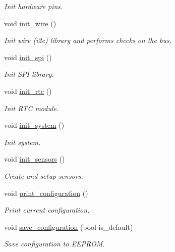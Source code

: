 \begin{DoxyCompactItemize}
\begin{DoxyCompactList}\small\item\em Init hardware pins. \end{DoxyCompactList}\item 
void \hyperlink{i2c-rain_8ino_a2441543100bf8421f56edd622a2c1d9a}{init\+\_\+wire} ()
\begin{DoxyCompactList}\small\item\em Init wire (i2c) library and performs checks on the bus. \end{DoxyCompactList}\item 
void \hyperlink{i2c-rain_8ino_a8eb9780a3438ec02c70314744f91f3c7}{init\+\_\+spi} ()
\begin{DoxyCompactList}\small\item\em Init S\+PI library. \end{DoxyCompactList}\item 
void \hyperlink{i2c-rain_8ino_ab985cc69f5f573113405b4f118c96d33}{init\+\_\+rtc} ()
\begin{DoxyCompactList}\small\item\em Init R\+TC module. \end{DoxyCompactList}\item 
void \hyperlink{i2c-rain_8ino_afceb890a6ab9be73cc5481369538c705}{init\+\_\+system} ()
\begin{DoxyCompactList}\small\item\em Init system. \end{DoxyCompactList}\item 
void \hyperlink{i2c-rain_8ino_ac74850003fab6eb3269bfe043d0f939c}{init\+\_\+sensors} ()
\begin{DoxyCompactList}\small\item\em Create and setup sensors. \end{DoxyCompactList}\item 
void \hyperlink{i2c-rain_8ino_a65b2dadc0411e43874ec8ed7f73bc62a}{print\+\_\+configuration} ()
\begin{DoxyCompactList}\small\item\em Print current configuration. \end{DoxyCompactList}\item 
void \hyperlink{i2c-rain_8ino_afa979a8cb238fe81bf20654dfd6096ef}{save\+\_\+configuration} (bool is\+\_\+default)
\begin{DoxyCompactList}\small\item\em Save configuration to E\+E\+P\+R\+OM. \end{DoxyCompactList}\item 

\end{DoxyCompactItemize}
